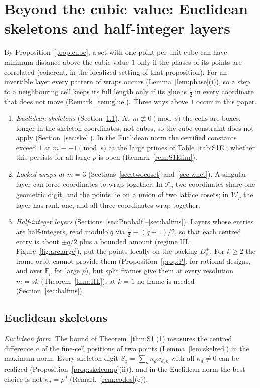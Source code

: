 \documentclass[11pt]{amsart}
\theoremstyle{definition}
\theoremstyle{plain}
\newcommand{\F}{\mathbb{F}}
\begin{document}
\section{Beyond the cubic value: Euclidean skeletons and half-integer layers}\label{sec:large}
By Proposition~\ref{prop:cube}, a set with one point per unit cube can have minimum distance above the cubic value $1$ only if the phases of its points are correlated (coherent, in the idealized setting of that proposition). For an invertible layer every pattern of wraps occurs (Lemma~\ref{lem:phase}(i)), so a step to a neighbouring cell keeps its full length only if its glue is $\frac12$ in every coordinate that does not move (Remark~\ref{rem:glue}). Three ways above $1$ occur in this paper.
\begin{enumerate}
\item[(i)] \emph{Euclidean skeletons} (Section~\ref{sec:S1E}). At $m\not\equiv0\pmod s$ the cells are boxes, longer in the skeleton coordinates, not cubes, so the cube constraint does not apply (Section~\ref{sec:skel}). In the Euclidean norm the certified constants exceed $1$ at $m\equiv-1\pmod s$ at the large primes of Table~\ref{tab:S1E}; whether this persists for all large $p$ is open (Remark~\ref{rem:S1Elim}).
\item[(ii)] \emph{Locked wraps at $m=3$} (Sections~\ref{sec:twocoset} and~\ref{sec:wnet}). A singular layer can force coordinates to wrap together. In $\mathcal T_p$ two coordinates share one geometric digit, and the points lie on a union of two lattice cosets; in $\mathcal W_p$ the layer has rank one, and all three coordinates wrap together.
\item[(iii)] \emph{Half-integer layers} (Sections~\ref{sec:Pnohalf}--\ref{sec:halfms}). Layers whose entries are half-integers, read modulo $q$ via $\frac12\equiv(q+1)/2$, so that each centred entry is about $\pm q/2$ plus a bounded amount (regime III, Figure~\ref{fig:arclarge}), put the points locally on the packing $D_s^+$. For $k\ge2$ the frame orbit cannot provide them (Proposition~\ref{prop:P}: for rational designs, and over $\F_p$ for large $p$), but split frames give them at every resolution $m=sk$ (Theorem~\ref{thm:HL}); at $k=1$ no frame is needed (Section~\ref{sec:halfms}).
\end{enumerate}

\subsection{Euclidean skeletons}\label{sec:S1E}
\emph{Euclidean form.} The bound of Theorem~\ref{thm:S1}(1) measures the centred difference $a$ of the fine-cell positions of two points (Lemma~\ref{lem:skelred}) in the maximum norm. Every skeleton digit $S_z=\sum_d\kappa_dx_{d,k}$ with all $\kappa_d\ne0$ can be realized (Proposition~\ref{prop:skelcomp}(ii)), and in the Euclidean norm the best choice is not $\kappa_d=\rho^d$ (Remark~\ref{rem:codes}(c)).
\end{document}
